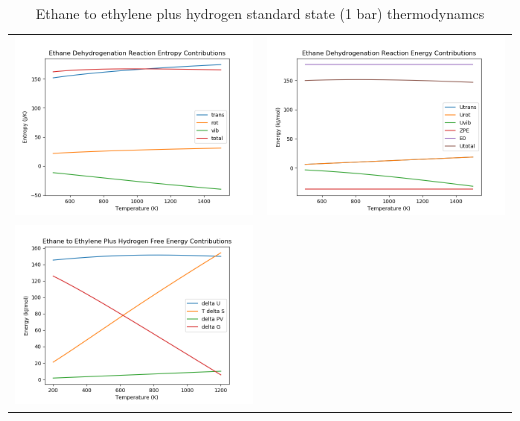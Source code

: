 \documentclass[11pt]{article}
\begin{document}
\begin{table}
   \caption{Ethane to ethylene plus hydrogen standard state (1 bar) thermodynamcs}
\begin{tabular}{cc}
\includegraphics[scale=0.5]{./Images/dehydro-entropy.png} & \includegraphics[scale=0.5]{./Images/dehydro-energy.png} \\ \includegraphics[scale=0.5]{./Images/dehydro.png} &

\end{tabular}
\end{table}
\end{document}
